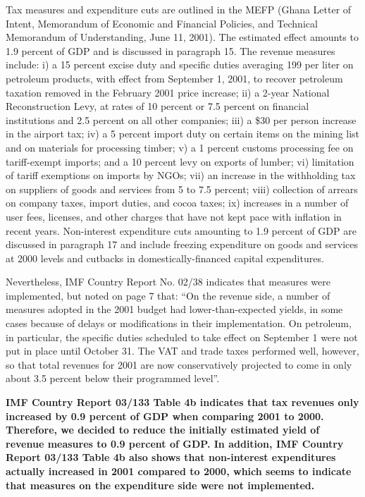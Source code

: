 Tax measures and expenditure cuts are outlined in the MEFP (Ghana Letter of Intent, Memorandum of Economic and Financial Policies, and Technical Memorandum of Understanding, June 11, 2001). The estimated effect amounts to 1.9 percent of GDP and is discussed in paragraph 15. The revenue measures include: i) a 15 percent excise duty and specific duties averaging 199 per liter on petroleum products, with effect from September 1, 2001, to recover petroleum taxation removed in the February 2001 price increase; ii) a 2-year National Reconstruction Levy, at rates of 10 percent or 7.5 percent on financial institutions and 2.5 percent on all other companies; iii) a \$30 per person increase in the airport tax; iv) a 5 percent import duty on certain items on the mining list and on materials for processing timber; v) a 1 percent customs processing fee on tariff-exempt imports; and a 10 percent levy on exports of lumber; vi)  limitation of tariff exemptions on imports by NGOs; vii) an increase in the withholding tax on suppliers of goods and services from 5 to 7.5 percent; viii) collection of arrears on company taxes, import duties, and cocoa taxes; ix) increases in a number of user fees, licenses, and other charges that have not kept pace with inflation in recent years. Non-interest expenditure cuts amounting to 1.9 percent of GDP are discussed in paragraph 17 and include freezing expenditure on goods and services at 2000 levels and cutbacks in domestically-financed capital expenditures.

Nevertheless, IMF Country Report No. 02/38 indicates that measures were implemented, but noted on page 7 that: “On the revenue side, a number of measures adopted in the 2001 budget had lower-than-expected yields, in some cases because of delays or modifications in their implementation. On petroleum, in particular, the specific duties scheduled to take effect on September 1 were not put in place until October 31. The VAT and trade taxes performed well, however, so that total revenues for 2001 are now conservatively projected to come in only about 3.5 percent below their programmed level”.

\textbf{IMF Country Report 03/133 Table 4b indicates that tax revenues only increased by 0.9 percent of GDP when comparing 2001 to 2000. Therefore, we decided to reduce the initially estimated yield of revenue measures to 0.9 percent of GDP. In addition, IMF Country Report 03/133 Table 4b also shows that non-interest expenditures actually increased in 2001 compared to 2000, which seems to indicate that measures on the expenditure side were not implemented.}

